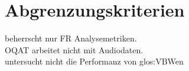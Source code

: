 \section{Abgrenzungskriterien}
\setcounter{counterKriterien}{0}
 \projektTitel beherrscht nur \gls{FR} Analysemetriken.\\
 \gls{OQAT} arbeitet nicht mit Audiodaten.\\
 \projektTitel untersucht nicht die Performanz von \gls{glos:VBW}en\\
